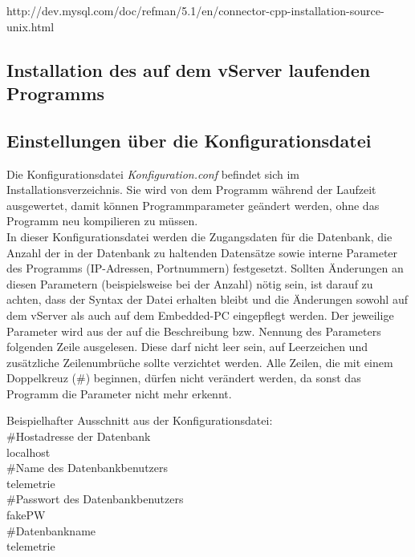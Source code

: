 \documentclass[fontsize = 12pt, paper = a4]{scrreprt}
\begin{document}
 http://dev.mysql.com/doc/refman/5.1/en/connector-cpp-installation-source-unix.html
 
 \subsection{Installation des auf dem vServer laufenden Programms}
 
 
 \subsection{Einstellungen über die Konfigurationsdatei}
Die Konfigurationsdatei \textit{Konfiguration.conf} befindet sich im Installationsverzeichnis. Sie wird von dem Programm während der Laufzeit ausgewertet, damit können Programmparameter geändert werden, ohne das Programm neu kompilieren zu müssen.\\
In dieser Konfigurationsdatei werden die Zugangsdaten für die Datenbank, die Anzahl der in der Datenbank zu haltenden Datensätze sowie interne Parameter des Programms (IP-Adressen, Portnummern) festgesetzt.
Sollten Änderungen an diesen Parametern (beispielsweise bei der Anzahl) nötig sein, ist darauf zu achten, dass der Syntax der Datei erhalten bleibt und die Änderungen sowohl auf dem vServer als auch auf dem Embedded-PC eingepflegt werden.
Der jeweilige Parameter wird aus der auf die Beschreibung bzw. Nennung des Parameters folgenden Zeile ausgelesen. 
Diese darf nicht leer sein, auf Leerzeichen und zusätzliche Zeilenumbrüche sollte verzichtet werden.
Alle Zeilen, die mit einem Doppelkreuz (\#) beginnen, dürfen nicht verändert werden, da sonst das Programm die Parameter nicht mehr erkennt.

Beispielhafter Ausschnitt aus der Konfigurationsdatei:\\

    \#Hostadresse der Datenbank\\
    localhost\\

    \#Name des Datenbankbenutzers\\
    telemetrie\\

    \#Passwort des Datenbankbenutzers\\
    fakePW\\

    \#Datenbankname\\
    telemetrie\\
\end{document}
